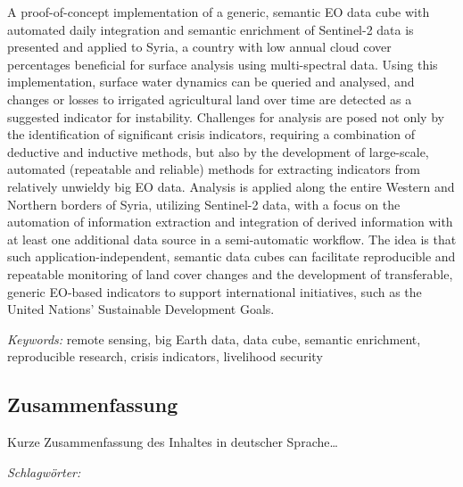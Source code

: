A proof-of-concept implementation of a generic, semantic EO data cube with automated daily integration and semantic enrichment of Sentinel-2 data is presented and applied to Syria, a country with low annual cloud cover percentages beneficial for surface analysis using multi-spectral data. Using this implementation, surface water dynamics can be queried and analysed, and changes or losses to irrigated agricultural land over time are detected as a suggested indicator for instability. Challenges for analysis are posed not only by the identification of significant crisis indicators, requiring a combination of deductive and inductive methods, but also by the development of large-scale, automated (repeatable and reliable) methods for extracting indicators from relatively unwieldy big EO data. Analysis is applied along the entire Western and Northern borders of Syria, utilizing Sentinel-2 data, with a focus on the automation of information extraction and integration of derived information with at least one additional data source in a semi-automatic workflow. The idea is that such application-independent, semantic data cubes can facilitate reproducible and repeatable monitoring of land cover changes and the development of transferable, generic EO-based indicators to support international initiatives, such as the United Nations’ Sustainable Development Goals.

\emph{Keywords:} remote sensing, big Earth data, data cube, semantic enrichment, reproducible research, crisis indicators, livelihood security


\vfill

\begin{otherlanguage}{ngerman}
\chapter*{Zusammenfassung}

Kurze Zusammenfassung des Inhaltes in deutscher Sprache\dots

\emph{Schlagwörter:}

\end{otherlanguage}

\endgroup

\vfill
